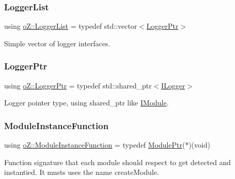 \mbox{\label{namespaceo_z_a2d18a70272709242e8e7ebffc3f1806c}} 
\subsubsection{\texorpdfstring{LoggerList}{LoggerList}}
{\footnotesize\ttfamily using \mbox{\hyperlink{namespaceo_z_a2d18a70272709242e8e7ebffc3f1806c}{o\+Z\+::\+Logger\+List}} = typedef std\+::vector$<$\mbox{\hyperlink{namespaceo_z_aaa2fbabbfafc6616a7e69651b62a3d4e}{Logger\+Ptr}}$>$}



Simple vector of logger interfaces. 

\mbox{\label{namespaceo_z_aaa2fbabbfafc6616a7e69651b62a3d4e}} 
\subsubsection{\texorpdfstring{LoggerPtr}{LoggerPtr}}
{\footnotesize\ttfamily using \mbox{\hyperlink{namespaceo_z_aaa2fbabbfafc6616a7e69651b62a3d4e}{o\+Z\+::\+Logger\+Ptr}} = typedef std\+::shared\+\_\+ptr$<$\mbox{\hyperlink{classo_z_1_1_i_logger}{I\+Logger}}$>$}



Logger pointer type, using shared\+\_\+ptr like \mbox{\hyperlink{classo_z_1_1_i_module}{I\+Module}}. 

\mbox{\label{namespaceo_z_ac1fa0fdab4bd08a5e127651d1f4150a2}} 
\subsubsection{\texorpdfstring{ModuleInstanceFunction}{ModuleInstanceFunction}}
{\footnotesize\ttfamily using \mbox{\hyperlink{namespaceo_z_ac1fa0fdab4bd08a5e127651d1f4150a2}{o\+Z\+::\+Module\+Instance\+Function}} = typedef \mbox{\hyperlink{namespaceo_z_af5a56aaaee027504979038f38991adcf}{Module\+Ptr}}($\ast$)(void)}



Function signature that each module should respect to get detected and instantied. It musts uses the name \textquotesingle{}create\+Module\textquotesingle{}. 

